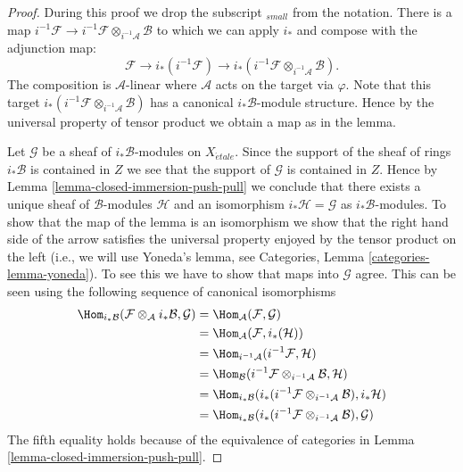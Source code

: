 \begin{proof}
During this proof we drop the subscript ${}_{small}$ from the notation.
There is a map
$i^{-1}\mathcal{F} \to
i^{-1}\mathcal{F} \otimes_{i^{-1}\mathcal{A}} \mathcal{B}$
to which we can apply $i_*$ and compose with the adjunction map:
$$
\mathcal{F} \longrightarrow
i_*(i^{-1}\mathcal{F}) \longrightarrow
i_*(i^{-1}\mathcal{F} \otimes_{i^{-1}\mathcal{A}} \mathcal{B}).
$$
The composition is $\mathcal{A}$-linear where $\mathcal{A}$ acts on the
target via $\varphi$. Note that this target
$i_*(i^{-1}\mathcal{F} \otimes_{i^{-1}\mathcal{A}} \mathcal{B})$
has a canonical $i_*\mathcal{B}$-module structure.
Hence by the universal property of tensor product we obtain
a map as in the lemma.

\medskip\noindent
Let $\mathcal{G}$ be a sheaf of $i_*\mathcal{B}$-modules on $X_{\acute{e}tale}$.
Since the support of the sheaf of rings $i_*\mathcal{B}$ is contained in
$Z$ we see that the support of $\mathcal{G}$ is contained in $Z$.
Hence by
Lemma \ref{lemma-closed-immersion-push-pull}
we conclude that there exists a unique sheaf of $\mathcal{B}$-modules
$\mathcal{H}$ and an isomorphism $i_*\mathcal{H} = \mathcal{G}$
as $i_*\mathcal{B}$-modules.
To show that the map of the lemma is an isomorphism we show that the
right hand side of the arrow satisfies the universal property enjoyed
by the tensor product on the left (i.e., we will use
Yoneda's lemma, see
Categories, Lemma \ref{categories-lemma-yoneda}).
To see this we have to show that maps into $\mathcal{G}$ agree.
This can be seen using the following sequence of canonical isomorphisms
\begin{align*}
\Hom_{i_*\mathcal{B}}(
\mathcal{F} \otimes_\mathcal{A} i_*\mathcal{B},
\mathcal{G})
& =
\Hom_\mathcal{A}(
\mathcal{F},
\mathcal{G}) \\
& =
\Hom_\mathcal{A}(
\mathcal{F},
i_*(\mathcal{H})) \\
& =
\Hom_{i^{-1}\mathcal{A}}(
i^{-1}\mathcal{F},
\mathcal{H}) \\
& =
\Hom_\mathcal{B}(
i^{-1}\mathcal{F} \otimes_{i^{-1}\mathcal{A}} \mathcal{B},
\mathcal{H}) \\
& =
\Hom_{i_*\mathcal{B}}(
i_*(i^{-1}\mathcal{F} \otimes_{i^{-1}\mathcal{A}} \mathcal{B}),
i_*\mathcal{H}) \\
& =
\Hom_{i_*\mathcal{B}}(
i_*(i^{-1}\mathcal{F} \otimes_{i^{-1}\mathcal{A}} \mathcal{B}),
\mathcal{G})
\end{align*}
The fifth equality holds because of the equivalence of categories in
Lemma \ref{lemma-closed-immersion-push-pull}.
\end{proof}






